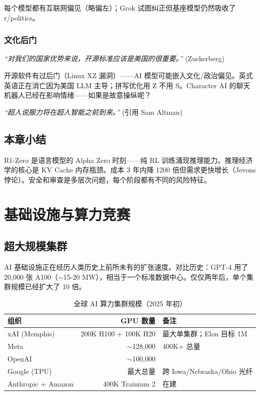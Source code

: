 \documentclass[a4paper]{article}
\begin{document}
每个模型都有互联网偏见（略偏左）；Grok 试图纠正但基座模型仍然吸收了 r/politics。

\subsubsection{文化后门}

\textit{``对我们的国家优势来说，开源标准应该是美国的很重要。''} (Zuckerberg)

开源软件有过后门（Linux XZ 漏洞）——AI 模型可能嵌入文化/政治偏见。英式英语正在消亡因为美国 LLM 主导；拼写优化用 Z 不用 S。Character AI 的聊天机器人已经在影响情绪——如果是故意操纵呢？

\textit{``超人说服力将在超人智能之前到来。''} (引用 Sam Altman)

\subsection{本章小结}

R1-Zero 是语言模型的 Alpha Zero 时刻——纯 RL 训练涌现推理能力。推理经济学的核心是 KV Cache 内存瓶颈。成本 3 年内降 1200 倍但需求更快增长（Jevons 悖论）。安全和审查是多层次问题，每个阶段都有不同的风险特征。

\section{基础设施与算力竞赛}

\subsection{超大规模集群}

AI 基础设施正在经历人类历史上前所未有的扩张速度。对比历史：GPT-4 用了 20,000 张 A100（$\sim$15-20 MW），相当于一个标准数据中心。仅仅两年后，单个集群规模已经扩大了 10 倍。

\begin{table}[H]
\centering
\begin{tabular}{lrl}
\toprule
\textbf{组织} & \textbf{GPU 数量} & \textbf{备注} \\
\midrule
xAI (Memphis) & 200K H100 + 100K H20 & 最大单集群；Elon 目标 1M \\
Meta & $\sim$128,000 & 400K+ 总量 \\
OpenAI & $\sim$100,000 & \\
Google (TPU) & 最大总量 & 跨 Iowa/Nebraska/Ohio 光纤 \\
Anthropic + Amazon & 400K Trainium 2 & 在建 \\
\bottomrule
\end{tabular}
\caption{全球 AI 算力集群规模（2025 年初）}
\end{table}
\end{document}
